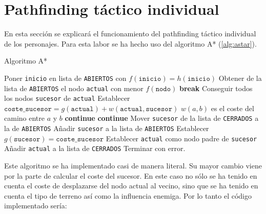 \section{Pathfinding táctico individual}

En esta sección se explicará el funcionamiento del pathfinding táctico individual de los personajes. Para esta labor se ha hecho uso del algoritmo A* (\ref{alg:astar}).

\begin{algorithm}
    \caption{Algoritmo A*}
    \label{alg:astar}
    \begin{algorithmic}[1]
         
        \State Poner \texttt{inicio} en lista de \texttt{ABIERTOS} con $f(\texttt{inicio}) = h(\texttt{inicio})$
        \State Obtener de la lista de \texttt{ABIERTOS} el nodo \texttt{actual} con menor $f(\texttt{nodo})$
         
        \State \textbf{break}
        \EndIf
        \State Conseguir todos los nodos \texttt{sucesor} de \texttt{actual}
        \State Establecer $\texttt{coste\_sucesor} = g(\texttt{actual}) + w(\texttt{actual}, \texttt{sucesor})$ \Comment $w(a,b)$ es el coste del camino entre $a$ y $b$
        \State \textbf{continue}
        \EndIf
        \State \textbf{continue}
        \EndIf
        \State Mover \texttt{sucesor} de la lista de \texttt{CERRADOS} a la de \texttt{ABIERTOS}
        \Else
        \State Añadir \texttt{sucesor} a la lista de \texttt{ABIERTOS}
        \EndIf
        \State Establecer $g(\texttt{sucesor}) = \texttt{coste\_sucesor}$
        \State Establecer \texttt{actual} como nodo padre de \texttt{sucesor}
        \EndFor
        \State Añadir \texttt{actual} a la lista de \texttt{CERRADOS}
        \EndWhile
         
        \State Terminar con error.
        \EndIf
        \EndProcedure
    \end{algorithmic}
\end{algorithm}

Este algoritmo se ha implementado casi de manera literal. Su mayor cambio viene por la parte de calcular el coste del sucesor. En este caso no sólo se ha tenido en cuenta el coste de desplazarse del nodo actual al vecino, sino que se ha tenido en cuenta el tipo de terreno así como la influencia enemiga. Por lo tanto el código implementado sería:



